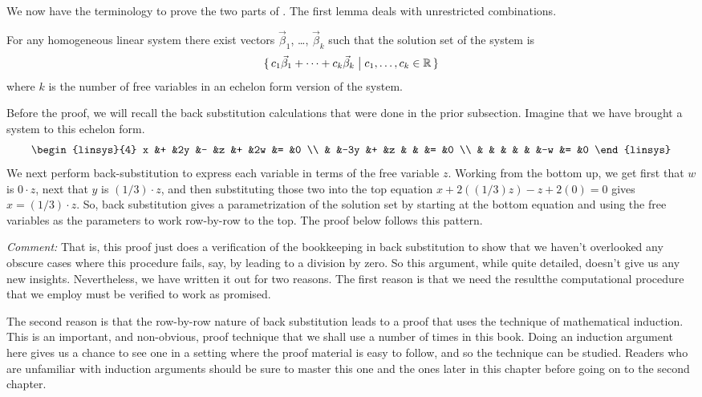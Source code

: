 We now have the terminology to prove the two parts of 
.
The first lemma deals with unrestricted combinations.

\begin{lemma}
\label{le:HomoSltnSpanVecs}
For any  homogeneous linear system there exist
vectors $\vec{\beta}_1$, \ldots, $\vec{\beta}_k$ such that the 
solution set of the system is
\begin{equation*}
  \mbox{$\{\,c_1\vec{\beta}_1+\cdots+c_k\vec{\beta}_k \bigm| c_1,\ldots,c_k\in\mathbb{R}\,\}$}
\end{equation*}
where $k$ is the
number of free variables in an echelon form version of the system.
\end{lemma}

Before the proof, we will recall the back substitution calculations 
that were done in the prior subsection.
Imagine that we have brought a system to this echelon form.
\begin{equation*}
  \begin{linsys}{4}
     x  &+  &2y  &-  &z  &+  &2w &=  &0  \\
        &   &-3y &+  &z  &   &   &=  &0  \\
        &   &    &   &   &   &-w &=  &0  
  \end{linsys}
\end{equation*}
We next perform back-substitution to 
express each variable in terms of the free variable $z$.
Working from the bottom up, we get first that \( w \) is \( 0\cdot z \), 
next that \( y \) is \( (1/3)\cdot z \), and then
substituting those two into the top equation
\( x+2((1/3)z)-z+2(0)=0 \) gives \( x=(1/3)\cdot z \).
So, back substitution gives a parametrization of the solution set by
starting at the bottom equation and using the free variables as the
parameters to work row-by-row to the top.
The proof below follows this pattern.
 
\textit{Comment:} That is, 
this proof just does a verification of the bookkeeping 
in back substitution to show that we haven't overlooked any obscure cases
where this procedure fails, say, by leading to a division by zero.
So this argument, while quite detailed, doesn't give us any new insights.
Nevertheless, we have written it out for two reasons.
The first reason is that we need the result\Dash the
computational procedure that we employ must be verified to work as promised.

The second reason is that the row-by-row nature of
back substitution leads to a proof that uses the technique of
mathematical induction.%
%
%
This is an important, and non-obvious, proof technique that we shall
use a number of times in this book.
Doing an induction argument here gives us a chance to 
see one in a setting where the proof material is easy to follow, 
and so the technique can be studied.
Readers who are unfamiliar with induction arguments should
be sure to master this one and the ones later in
this chapter before going on to the second chapter.

